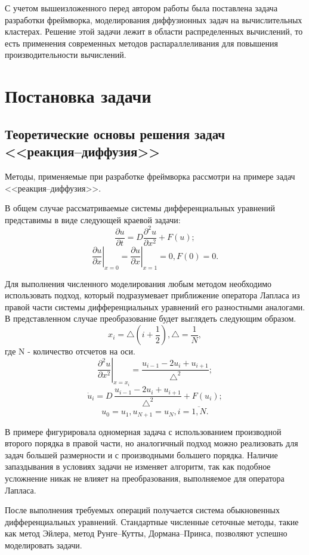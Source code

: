 \documentclass[a4paper, 14pt]{extarticle}
\theoremstyle{definition}
\begin{document}
С учетом вышеизложенного перед автором работы была поставлена задача разработки фреймворка, моделирования диффузионных задач на вычислительных кластерах. Решение этой задачи лежит в области распределенных вычислений, то есть применения современных методов распараллеливания для повышения производительности вычислений.




\section{Постановка задачи}

\subsection{Теоретические основы решения задач <<реакция--диффузия>>}
Методы, применяемые при разработке фреймворка рассмотри на примере задач <<реакция--диффузия>>.

В общем случае рассматриваемые системы дифференциальных уравнений представимы в виде следующей краевой задачи:
$$\frac{\partial u}{\partial t} = D \frac{\partial^2 u}{\partial x^2} + F(u);$$
$$\left.{\frac{\partial u}{\partial x}} \right|_{x=0} = \left.{\frac{\partial u}{\partial x}} \right|_{x=1} = 0, F(0) = 0.$$

Для выполнения численного моделирования любым методом необходимо использовать подход, который подразумевает приближение оператора Лапласа из правой части системы дифференциальных уравнений его разностными аналогами. В представленном случае преобразование будет выглядеть следующим образом.
$$x_i = \bigtriangleup(i + \frac{1}{2}), \bigtriangleup = \frac{1}{N},$$
где N - количество отсчетов на оси.
$$\left.{\frac{\partial^2 u}{\partial x^2}}\right|_{x=x_i} = \frac{u_{i-1} - 2u_i + u_{i+1}}{\bigtriangleup^2};$$
$$\dot u_i = D\, \frac{u_{i-1} - 2u_i + u_{i+1}}{\bigtriangleup^2} + F(u_i);$$
$$u_0 = u_1, u_{N+1} = u_N, i = \overline{1, N}.$$

В примере фигурировала одномерная задача с использованием производной второго порядка в правой части, но аналогичный подход можно реализовать для задач большей размерности и с производными большего порядка. Наличие запаздывания в условиях задачи не изменяет алгоритм, так как подобное усложнение никак не влияет на преобразования, выполняемое для оператора Лапласа.

После выполнения требуемых операций получается система обыкновенных дифференциальных уравнений.  Стандартные численные сеточные методы, такие как метод Эйлера, метод Рунге--Кутты, Дормана--Принса, позволяют успешно моделировать задачи\cite{Thomas}. 
\end{document}
